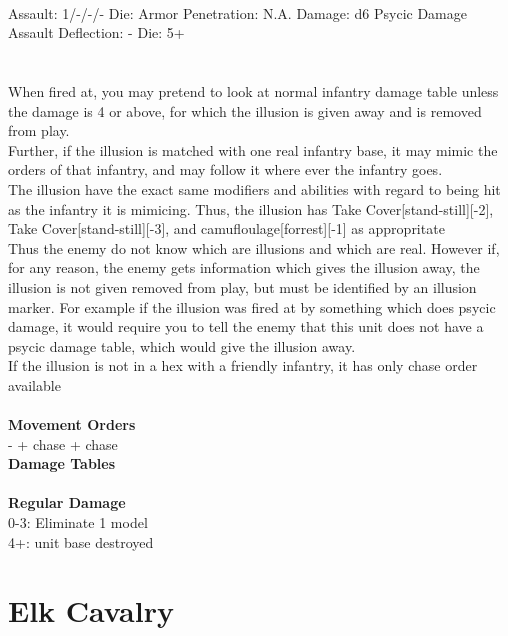 \ \\
Assault: 1/-/-/- Die:  Armor Penetration: N.A. Damage: d6 Psycic Damage \\
Assault Deflection: - Die: 5+\\
\indent  \\
\ \\
When fired at, you may pretend to look at normal infantry damage table unless the damage is 4 or above, for which the illusion is given away and is removed from play. \\ Further, if the illusion is matched with one real infantry base, it may mimic the orders of that infantry, and may follow it where ever the infantry goes. \\ The illusion have the exact same modifiers and abilities with regard to being hit as the infantry it is mimicing. Thus, the illusion has Take Cover[stand-still][-2], Take Cover[stand-still][-3], and camufloulage[forrest][-1] as appropritate \\ Thus the enemy do not know which are illusions and which are real. However if, for any reason, the enemy gets information which gives the illusion away, the illusion is not given removed from play, but must be identified by an illusion marker. For example if the illusion was fired at by something which does psycic damage, it would require you to tell the enemy that this unit does not have a psycic damage table, which would give the illusion away. \\ If the illusion is not in a hex with a friendly infantry, it has only chase order available
\ \\


\ \\ {\bf Movement Orders } \\
- + chase + chase \\



{\bf Damage Tables} \\
\ \\ {\bf Regular Damage } \\
0-3: Eliminate 1 model \\
4+: unit base destroyed \\









\pagebreak

\section{ Elk Cavalry }

